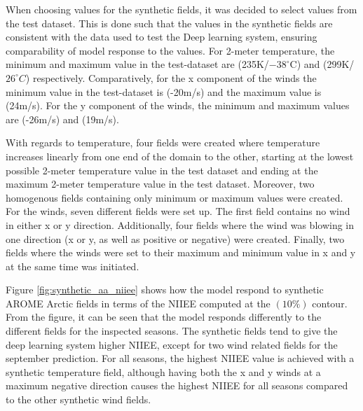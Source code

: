 \documentclass[../main/thesis.tex]{subfiles}
\begin{document}
When choosing values for the synthetic fields, it was decided to select values from the test dataset. This is done such that the values in the synthetic fields are consistent with the data used to test the Deep learning system, ensuring comparability of model response to the values. For 2-meter temperature, the minimum and maximum value in the test-dataset are (235K/$-38^{\circ}$C) and (299K/$26^{\circ}C$) respectively. Comparatively, for the x component of the winds the minimum value in the test-dataset is (-20m/s) and the maximum value is (24m/s). For the y component of the winds, the minimum and maximum values are (-26m/s) and (19m/s).

With regards to temperature, four fields were created where temperature increases linearly from one end of the domain to the other, starting at the lowest possible 2-meter temperature value in the test dataset and ending at the maximum 2-meter temperature value in the test dataset. Moreover, two homogenous fields containing only minimum or maximum values were created. For the winds, seven different fields were set up. The first field contains no wind in either x or y direction. Additionally, four fields where the wind was blowing in one direction (x or y, as well as positive or negative) were created. Finally, two fields where the winds were set to their maximum and minimum value in x and y at the same time was initiated.

Figure \ref{fig:synthetic_aa_niiee} shows how the model respond to synthetic AROME Arctic fields in terms of the NIIEE computed at the $(10\%)$ contour. From the figure, it can be seen that the model responds differently to the different fields for the inspected seasons. The synthetic fields tend to give the deep learning system higher NIIEE, except for two wind related fields for the september prediction. For all seasons, the highest NIIEE value is achieved with a synthetic temperature field, although having both the x and y winds at a maximum negative direction causes the highest NIIEE for all seasons compared to the other synthetic wind fields.
\end{document}
